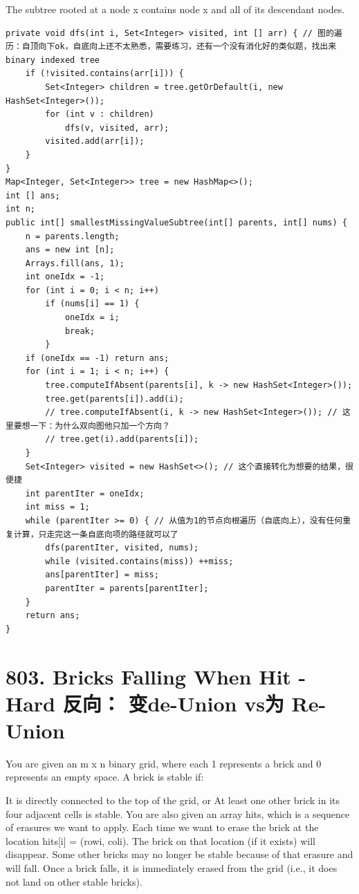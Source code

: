 \documentclass[9pt, b5paaper]{book}
\begin{document}
The subtree rooted at a node x contains node x and all of its descendant nodes.
\begin{verbatim}
private void dfs(int i, Set<Integer> visited, int [] arr) { // 图的遍历：自顶向下ok，自底向上还不太熟悉，需要练习，还有一个没有消化好的类似题，找出来binary indexed tree
    if (!visited.contains(arr[i])) {
        Set<Integer> children = tree.getOrDefault(i, new HashSet<Integer>());
        for (int v : children) 
            dfs(v, visited, arr);
        visited.add(arr[i]);
    }
}
Map<Integer, Set<Integer>> tree = new HashMap<>();
int [] ans;
int n;
public int[] smallestMissingValueSubtree(int[] parents, int[] nums) {
    n = parents.length;
    ans = new int [n];
    Arrays.fill(ans, 1); 
    int oneIdx = -1;
    for (int i = 0; i < n; i++) 
        if (nums[i] == 1) {
            oneIdx = i;
            break;
        }
    if (oneIdx == -1) return ans;
    for (int i = 1; i < n; i++) {
        tree.computeIfAbsent(parents[i], k -> new HashSet<Integer>());
        tree.get(parents[i]).add(i);
        // tree.computeIfAbsent(i, k -> new HashSet<Integer>()); // 这里要想一下：为什么双向图他只加一个方向？
        // tree.get(i).add(parents[i]);
    }
    Set<Integer> visited = new HashSet<>(); // 这个直接转化为想要的结果，很便捷
    int parentIter = oneIdx;
    int miss = 1;
    while (parentIter >= 0) { // 从值为1的节点向根遍历（自底向上），没有任何重复计算，只走完这一条自底向项的路径就可以了
        dfs(parentIter, visited, nums);
        while (visited.contains(miss)) ++miss;
        ans[parentIter] = miss;
        parentIter = parents[parentIter];
    }
    return ans;
}
\end{verbatim}

\section{803. Bricks Falling When Hit - Hard 反向： 变de-Union vs为 Re-Union}
\label{sec-17-3}
You are given an m x n binary grid, where each 1 represents a brick and 0 represents an empty space. A brick is stable if:

It is directly connected to the top of the grid, or
At least one other brick in its four adjacent cells is stable.
You are also given an array hits, which is a sequence of erasures we want to apply. Each time we want to erase the brick at the location hits[i] = (rowi, coli). The brick on that location (if it exists) will disappear. Some other bricks may no longer be stable because of that erasure and will fall. Once a brick falls, it is immediately erased from the grid (i.e., it does not land on other stable bricks).
\end{document}

